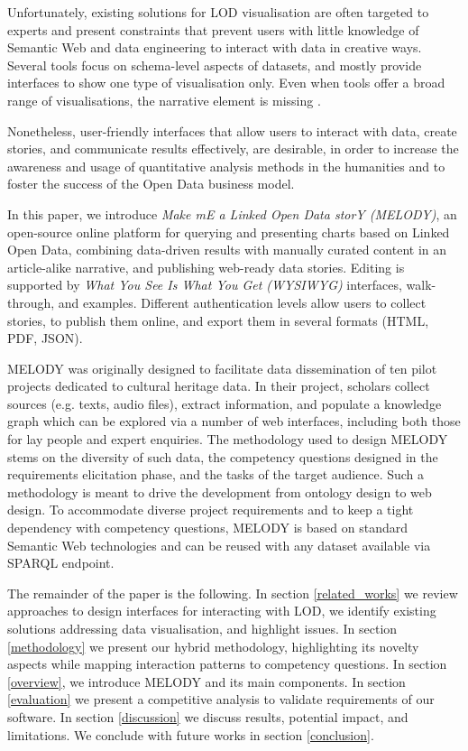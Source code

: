 \documentclass[manuscript]
{acmart}
\begin{document}
Unfortunately, existing solutions for LOD visualisation are often targeted to experts and present constraints that prevent users with little knowledge of Semantic Web and data engineering to interact with data in creative ways. Several tools focus on schema-level aspects of datasets, and mostly provide interfaces to show one type of visualisation only. Even when tools offer a broad range of visualisations, the narrative element is missing \cite{desimoni_empirical_2020}.

Nonetheless, user-friendly interfaces that allow users to interact with data, create stories, and communicate results effectively, are desirable, in order to increase the awareness and usage of quantitative analysis methods in the humanities and to foster the success of the Open Data business model.

In this paper, we introduce {\itshape Make mE a Linked Open Data storY (MELODY)}, an open-source online platform for querying and presenting charts based on Linked Open Data, combining data-driven results with manually curated content in an article-alike narrative, and publishing web-ready data stories. Editing is supported by {\itshape What You See Is What You Get (WYSIWYG)} interfaces, walk-through, and examples. Different authentication levels allow users to collect stories, to publish them online, and export them in several formats (HTML, PDF, JSON).

MELODY was originally designed to facilitate data dissemination of ten pilot projects dedicated to cultural heritage data. In their project, scholars collect sources (e.g. texts, audio files), extract information, and populate a knowledge graph which can be explored via a number of web interfaces, including both those for lay people and expert enquiries. The methodology used to design MELODY stems on the diversity of such data, the competency questions designed in the requirements elicitation phase, and the tasks of the target audience. Such a methodology is meant to drive the development from ontology design to web design. To accommodate diverse project requirements and to keep a tight dependency with competency questions, MELODY is based on standard Semantic Web technologies and can be reused with any dataset available via SPARQL endpoint.

The remainder of the paper is the following. In section \ref{related_works} we review approaches to design interfaces for interacting with LOD, we identify existing solutions addressing data visualisation, and highlight issues. In section \ref{methodology} we present our hybrid methodology, highlighting its novelty aspects while mapping interaction patterns to competency questions. In section \ref{overview}, we introduce MELODY and its main components. In section \ref{evaluation} we present a competitive analysis to validate requirements of our software. In section \ref{discussion} we discuss results, potential impact, and limitations. We conclude with future works in section \ref{conclusion}.
\end{document}
